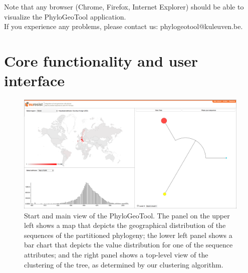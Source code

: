\documentclass[a4paper, 11pt]{article} %
\begin{document}
Note that any browser (Chrome, Firefox, Internet Explorer) should be able to visualize the PhyloGeoTool application.\\

\noindent If you experience any problems, please contact us: phylogeotool@kuleuven.be.


\section{Core functionality and user interface}
\label{sec:core_func_user_interface}
\begin{figure}[H]
\centering
\includegraphics[scale=0.1875]{images/defaultScreenshot.png}
\vspace{-0.75cm}
\caption{Start and main view of the PhyloGeoTool. 
The panel on the upper left shows a map that depicts the geographical distribution of the sequences of the partitioned phylogeny; the lower left panel shows a bar chart that depicts the value distribution for one of the sequence attributes; and the right panel shows a top-level view of the clustering of the tree, as determined by our clustering algorithm. 
}
\label{fig:initialview}
\end{figure}
\end{document}
